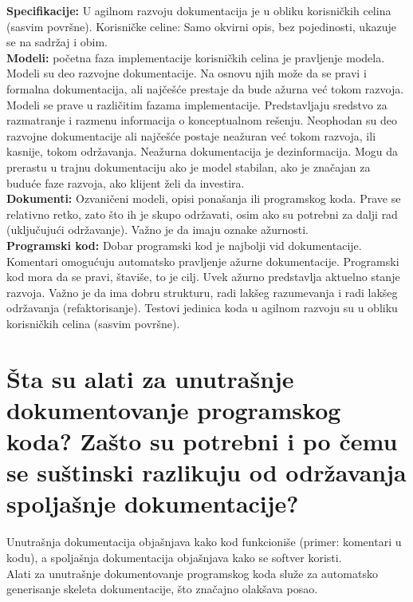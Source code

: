 \documentclass[a4paper]{article}
\begin{document}
  \textbf{Specifikacije:} U agilnom razvoju dokumentacija je u obliku korisničkih celina 
  (sasvim površne). Korisničke celine: Samo okvirni opis, bez pojedinosti, ukazuje se na sadržaj i 
  obim.\\

  \textbf{Modeli:} početna faza implementacije korisničkih celina je pravljenje modela. 
  Modeli su deo razvojne dokumentacije. Na osnovu njih može da se pravi i formalna dokumentacija, 
  ali najčešće prestaje da bude ažurna već tokom razvoja. Modeli se prave u različitim fazama 
  implementacije. Predstavljaju sredstvo za razmatranje i razmenu informacija o konceptualnom rešenju. 
  Neophodan su deo razvojne dokumentacije ali najčešće postaje neažuran već tokom razvoja, ili 
  kasnije, tokom održavanja. Neažurna dokumentacija je dezinformacija. Mogu da prerastu u trajnu 
  dokumentaciju ako je model stabilan, ako je značajan za buduće faze razvoja, ako klijent želi da 
  investira.\\

  \textbf{Dokumenti:} Ozvaničeni modeli, opisi ponašanja ili programskog koda. Prave se relativno 
  retko, zato što ih je skupo održavati, osim ako su potrebni za dalji rad (uključujući održavanje). 
  Važno je da imaju oznake ažurnosti.\\

  \textbf{Programski kod:} Dobar programski kod je najbolji vid dokumentacije. 
  Komentari omogućuju automatsko pravljenje ažurne dokumentacije.
  Programski kod mora da se pravi, štaviše, to je cilj. Uvek ažurno predstavlja aktuelno 
  stanje razvoja. Važno je da ima dobru strukturu, radi lakšeg razumevanja i radi lakšeg održavanja 
  (refaktorisanje). Testovi jedinica koda u agilnom razvoju su u obliku korisničkih 
  celina (sasvim površne).
  
\section{Šta su alati za unutrašnje dokumentovanje programskog koda? Zašto su potrebni i po čemu 
         se suštinski razlikuju od održavanja spoljašnje dokumentacije?}
  Unutrašnja dokumentacija objašnjava kako kod funkcioniše (primer: komentari u kodu), a
  spoljašnja dokumentacija objašnjava kako se softver koristi.\\

  Alati za unutrašnje dokumentovanje programskog koda služe za automatsko generisanje
  skeleta dokumentacije, što značajno olakšava posao.
\end{document}
